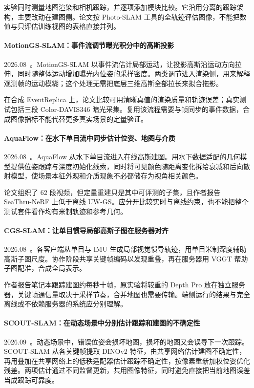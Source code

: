 实验同时测量地图渲染和相机跟踪，并逐项添加模块比较。它沿用分离的跟踪架构，主要改动在建图侧。论文按 Photo-SLAM 工具的全轨迹评估图像，不能把数值与只评估训练视图的表格直接并列。

\paragraph{MotionGS-SLAM：事件流调节曝光积分中的高斯投影}
2026.08~\cite{2608_15024}。MotionGS-SLAM 以事件流估计局部运动，让投影高斯沿运动方向拉伸，同时随整体运动增加曝光内位姿的采样密度。两类调节进入渲染侧，用来解释观测帧的运动模糊；这个处理无需把底层三维高斯全部拉长来拟合拖影。

在合成 EventReplica 上，论文比较可用清晰真值的渲染质量和轨迹误差；真实测试包括三段 Color-DAVIS346 暗光采集。复用该流程需要与帧同步的事件数据，合成图像指标不能代替更多真实场景的定量验证。

\paragraph{AquaFlow：在水下单目流中同步估计位姿、地图与介质}
2026.08~\cite{2608_22906}。AquaFlow 从水下单目流进入在线高斯建图。用水下数据适配的几何模型提供位姿跟踪与深度初始化线索，同时将可见颜色随距离变化拆给衰减和后向散射模型，使场景本征外观和介质现象不必都储存为视角相关颜色。

论文组织了 62 段视频，但定量重建只是其中可评测的子集，且作者报告 SeaThru-NeRF 上低于离线 UW-GS。应分开比较实时与离线约束，也不能把整个测试套件看作均有米制轨迹和参考几何。

\paragraph{CGS-SLAM：让单目惯导局部高斯子图在服务器对齐}
2026.08~\cite{2608_26868}。各客户端从单目与 IMU 生成局部视觉惯导轨迹，用单目米制深度辅助高斯子图尺度。协作阶段共享关键帧编码以发现重叠，再在服务器用 VGGT 帮助子图配准，合成全局表示。

作者报告笔记本跟踪建图约每秒十帧，原实验将较重的 Depth Pro 放在独立服务器，关键帧通信量取决于采样节奏，合并地图也需要传输。端侧运行的结果与完全离线或不依赖服务器的系统应分别理解。

\paragraph{SCOUT-SLAM：在动态场景中分别估计跟踪和建图的不确定性}
2026.09~\cite{2609_14634}。动态场景中，错误位姿会损坏地图，损坏的地图又会误导下一次跟踪。SCOUT-SLAM 从各关键帧提取 DINOv2 特征，由共享网络估计建图不确定性，再用叠加在共享网络上的低秩适配器估计跟踪不确定性，按像素重新加权位姿优化残差。两项估计通过不同监督更新，共用图像特征，同时避免直接把当前地图误差当成跟踪可靠度。

